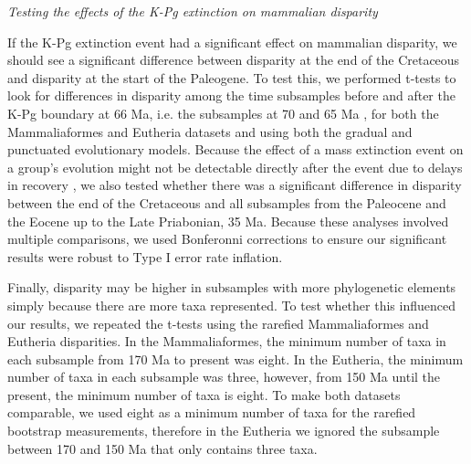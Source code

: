 \documentclass[12pt,letterpaper]{article}
\renewcommand{\subsection}[1]{%
\bigskip
\begin{center}
\begin{large}
\normalfont\itshape #1
\end{large}
\end{center}}
\begin{document}
\subsection{Testing the effects of the K-Pg extinction on mammalian disparity}
If the K-Pg extinction event had a significant effect on mammalian disparity, we should see a significant difference between disparity at the end of the Cretaceous and disparity at the start of the Paleogene.
To test this, we performed t-tests to look for differences in disparity among the time subsamples before and after the K-Pg boundary at 66 Ma, i.e. the subsamples at 70 and 65 Ma \citep[e.g. as used in][]{anderson2012using,zelditch2012geometric,smith2014joined}, for both the Mammaliaformes and Eutheria datasets and using both the gradual and punctuated evolutionary models.
Because the effect of a mass extinction event on a group's evolution might not be detectable directly after the event due to delays in recovery \citep[e.g.][estimated that ecosystems only fully recovered 8-9 Ma after the Permo-Triassic mass extinction]{chen2012timing}, we also tested whether there was a significant difference in disparity between the end of the Cretaceous and all subsamples from the Paleocene and the Eocene up to the Late Priabonian, 35 Ma.
Because these analyses involved multiple comparisons, we used Bonferonni corrections \citep{holm1979simple} to ensure our significant results were robust to Type I error rate inflation. 


Finally, disparity may be higher in subsamples with more phylogenetic elements simply because there are more taxa represented.
To test whether this influenced our results, we repeated the t-tests using the rarefied Mammaliaformes and Eutheria disparities.
In the Mammaliaformes, the minimum number of taxa in each subsample from 170 Ma to present was eight.
In the Eutheria, the minimum number of taxa in each subsample was three, however, from 150 Ma until the present, the minimum number of taxa is eight.
To make both datasets comparable, we used eight as a minimum number of taxa for the rarefied bootstrap measurements, therefore in the Eutheria we ignored the subsample between 170 and 150 Ma that only contains three taxa.

\end{document}
